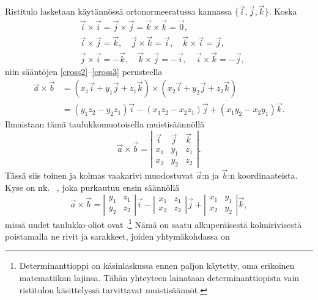 Ristitulo lasketaan käytännössä ortonormeeratussa kannassa $\{\vec i,\vec j,\vec k\}$. Koska
\begin{align*}
&\vec i \times \vec i = \vec j \times \vec j = \vec k \times \vec k = \vec 0, \\
&\vec i \times \vec j = \vec k, \quad \vec j \times \vec k 
                      = \vec i, \quad \vec k \times \vec i = \vec j, \\
&\vec j \times \vec i = -\vec k, \quad \vec k \times \vec j 
                      = -\vec i, \quad \vec i \times \vec k = -\vec j,
\end{align*}
niin sääntöjen \eqref{cross2}--\eqref{cross3} perusteella
\begin{align*}
\vec a \times \vec b &= (x_1\vec i + y_1\vec j + z_1\vec k) 
                                            \times (x_2\vec i + y_2\vec j + z_2\vec k) \\
                     &= (y_1z_2-y_2z_1)\vec i - (x_1z_2-x_2z_1)\vec j + (x_1y_2-x_2y_1)\vec k.
\end{align*}
Ilmaistaan tämä taulukkomuotoisella muistisäännöllä
\[
\vec a \times \vec b = \left| \begin{array}{ccc}
\vec i & \vec j & \vec k \\
x_1 & y_1 & z_1 \\
x_2 & y_2 & z_2 
\end{array} \right|.
\]
Tässä siis toinen ja kolmas vaakarivi muodostuvat $\vec a$:n ja $\vec b$:n koordinaateista.
Kyse on nk.\ 
%
, joka purkautuu ensin säännöllä
\[
\vec a \times \vec b = \left|\begin{array}{cc} 
y_1 & z_1 \\
y_2 & z_2
\end{array} \right| \vec i -
\left|\begin{array}{cc} 
x_1 & z_1 \\
x_2 & z_2
\end{array} \right| \vec j +
\left|\begin{array}{cc} 
x_1 & y_1 \\
x_2 & y_2
\end{array} \right| \vec k,
\]
missä uudet taulukko-oliot ovat %
.\footnote[2]{Determinanttioppi on käsinlaskussa
ennen paljon käytetty, oma erikoinen matematiikan lajinsa. Tähän yhteyteen lainataan 
determinanttiopista vain ristitulon käsittelyssä tarvittavat muistisäännöt.} Nämä on saatu 
alkuperäisestä kolmirivisestä poistamalla ne rivit ja sarakkeet, joiden yhtymäkohdassa on 
